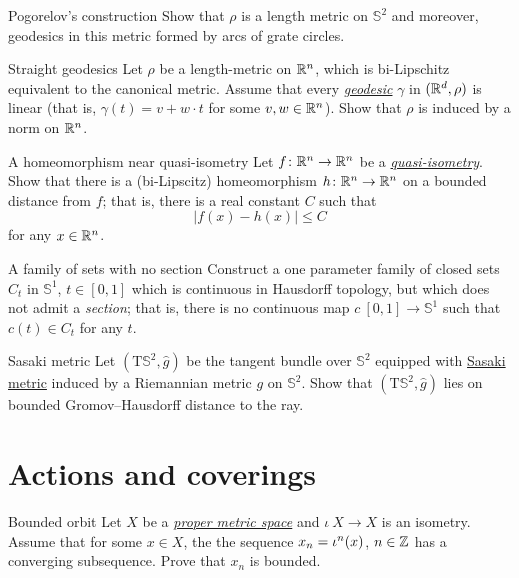\documentclass[twoside]{book}
\begin{document}
{\begin{pr}{}{Pogorelov's construction}
Show that $\rho$ is a length metric on $\mathbb{S}^2$
and moreover, geodesics in this metric formed by arcs of grate circles.
\end{pr}

\begin{pr}{}{Straight geodesics}\label{Straight geodesics}
Let $\rho$ be a length-metric on $\mathbb{R}^n$, which is bi-Lipschitz equivalent to the canonical metric.
Assume that every \hyperref[Geodesic]{\emph{ge\-o\-de\-sic}} $\gamma$ in $(\mathbb{R}^d,\rho)$ is linear 
(that is, $\gamma(t)=v+w\cdot t$ for some $v,w\in\mathbb{R}^n$).
Show that $\rho$ is induced by a norm on $\mathbb{R}^n$.
\end{pr}

\begin{pr}{\thm}{A homeomorphism near quasi-isometry}\label{hom-near-QI} 
Let $f\colon\mathbb{R}^n\to\mathbb{R}^n$ be a \hyperref[Quasi-isometry]{\emph{quasi-isometry}}.
Show that there is a (bi-Lipscitz) homeomorphism 
$h\colon\mathbb{R}^n\to\mathbb{R}^n$ on a bounded distance from $f$;
that is, there is a real constant $C$ such that
$$|f(x)-h(x)|\le C$$
for any $x\in\mathbb{R}^n$.
\end{pr}

\begin{pr}{}{A family of sets with no section}\label{hausdorff-section} 
Construct a one parameter family of closed sets $C_t$ in $\mathbb{S}^1$, $t\in [0,1]$
which is continuous in Hausdorff topology, 
but which does not admit a \emph{section};
that is, there is no continuous 
map $c\:[0,1]\to \mathbb{S}^1$ such that $c(t)\in C_t$ for any $t$.
\end{pr}

\begin{pr}{}{Sasaki metric}\label{pr:Sasaki metric}
Let $(\mathrm{T} \mathbb{S}^2, \hat g)$
be the tangent bundle over $\mathbb{S}^2$ 
equipped with \hyperref[Sasaki metric]{Sasaki metric} induced by a Riemannian metric $g$ on $\mathbb{S}^2$.
Show that $(\mathrm{T} \mathbb{S}^2, \hat g)$ lies on bounded Gromov--Hausdorff distance to the ray.
\end{pr}




\chapter{Actions and coverings}


\begin{pr}{}{Bounded orbit}\label{Bounded orbit} Let $X$ be a 
\hyperref[Proper metric space]{\emph{proper metric space}} 
and $\iota\:X\to X$ is an isometry.
Assume that for some $x\in X$, the the sequence $x_n\z=\iota^n(x)$, $n\in\mathbb{Z}$ has a converging subsequence.
Prove that $x_n$ is bounded.
\end{pr}

}
\end{document}
